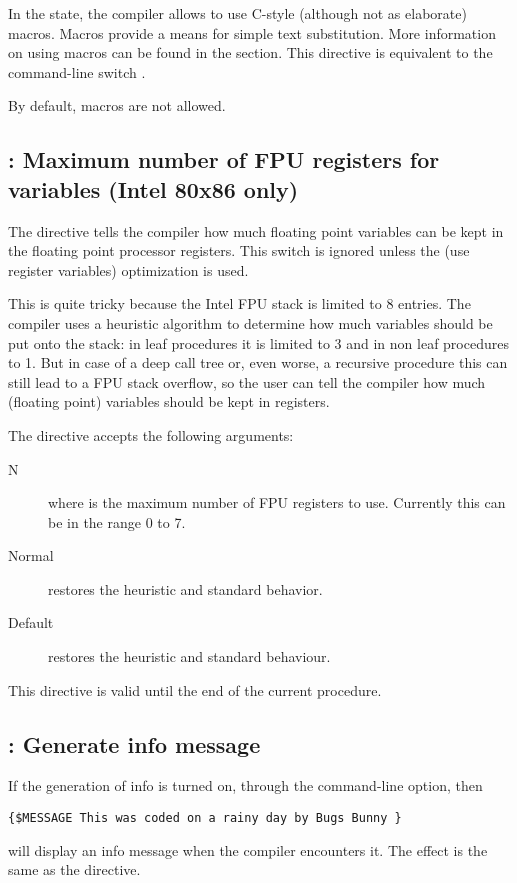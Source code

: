 In the  state, the compiler allows to use C-style
(although not as elaborate) macros. Macros provide a means for simple text
substitution. More information on using macros can be found in the
 section. This directive is equivalent to the command-line
switch .

By default, macros are not allowed.

\subsection{ : Maximum number of FPU registers for variables (Intel 80x86 only)}

The  directive tells the compiler how much floating point
variables can be kept in the floating point processor registers. This switch is ignored
unless the  (use register variables) optimization is used.

This is quite tricky because the Intel FPU stack is limited to 8 entries.
The compiler uses a heuristic algorithm to determine how much variables should be
put onto the stack: in leaf procedures it is limited to 3 and in non leaf
procedures to 1. But in case of a deep call tree or, even worse, a recursive
procedure this can still lead to a FPU stack overflow, so the user can tell
the compiler how much (floating point) variables should be kept in registers.

The directive accepts the following arguments:

\begin{description}
\item [N] where  is the maximum number of FPU registers to use.
Currently this can be in the range 0 to 7.
\item[Normal] restores the heuristic and standard behavior.
\item[Default] restores the heuristic and standard behaviour.
\end{description}

\begin{remark}This directive is valid until the end of the current procedure.
\end{remark}

\subsection{ : Generate info message}

If the generation of info is turned on, through the  command-line
option, then
\begin{verbatim}
{$MESSAGE This was coded on a rainy day by Bugs Bunny }
\end{verbatim}
will display an info message when the compiler encounters it. The effect is
the same as the  directive.


